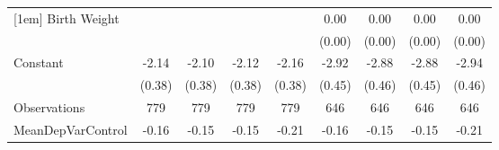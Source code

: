 {\begin{tabular}{l*{8}{c}}
[1em]
Birth Weight        &                     &                     &                     &                     &        0.00\sym{***}&        0.00\sym{***}&        0.00\sym{***}&        0.00\sym{***}\\
                    &                     &                     &                     &                     &      (0.00)         &      (0.00)         &      (0.00)         &      (0.00)         \\
[1em]
Constant            &       -2.14\sym{***}&       -2.10\sym{***}&       -2.12\sym{***}&       -2.16\sym{***}&       -2.92\sym{***}&       -2.88\sym{***}&       -2.88\sym{***}&       -2.94\sym{***}\\
                    &      (0.38)         &      (0.38)         &      (0.38)         &      (0.38)         &      (0.45)         &      (0.46)         &      (0.45)         &      (0.46)         \\
\hline
Observations        &         779         &         779         &         779         &         779         &         646         &         646         &         646         &         646         \\
MeanDepVarControl   &       -0.16         &       -0.15         &       -0.15         &       -0.21         &       -0.16         &       -0.15         &       -0.15         &       -0.21         \\
\hline\hline
\end{tabular}
}
